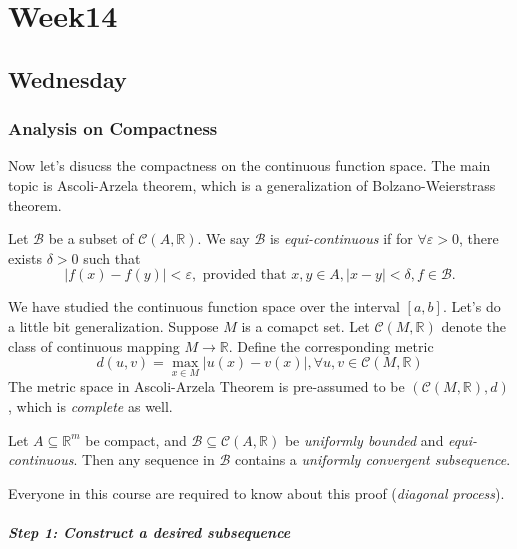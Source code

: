 
\chapter{Week14}
\section{Wednesday}
\subsection{Analysis on Compactness}
Now let's disucss the compactness on the continuous function space. The main topic is Ascoli-Arzela theorem, which is a generalization of Bolzano-Weierstrass theorem.
\begin{definition}
Let $\mathcal{B}$ be a subset of $\mathcal{C}(A,\mathbb{R})$. We say $\mathcal{B}$ is \emph{equi-continuous} if for $\forall\varepsilon>0$, there exists $\delta>0$ such that
\[
|f(x)-f(y)|<\varepsilon,
\mbox{ provided that }x,y\in A,|x-y|<\delta,f\in\mathcal{B}.
\]
\end{definition}
%
%
\begin{remark}
We have studied the continuous function space over the interval $[a,b]$. Let's do a little bit generalization. Suppose $M$ is a comapct set. Let $\mathcal{C}(M,\mathbb{R})$ denote the class of continuous mapping $M\to\mathbb{R}$. Define the corresponding metric
\[
d(u,v)=\max_{x\in M}|u(x)-v(x)|,\forall u,v\in\mathcal{C}(M,\mathbb{R})
\]
The metric space in Ascoli-Arzela Theorem is pre-assumed to be $(\mathcal{C}(M,\mathbb{R}),d)$, which is \emph{complete} as well.
\end{remark}

\begin{theorem}
Let $A\subseteq\mathbb{R}^m$ be compact, and $\mathcal{B}\subseteq\mathcal{C}(A,\mathbb{R})$ be \emph{uniformly bounded} and \emph{equi-continuous}. Then any sequence in $\mathcal{B}$ contains a \emph{uniformly convergent subsequence}.
\end{theorem}
\begin{remark}
Everyone in this course are required to know about this proof (\textit{diagonal process}).
\end{remark}

\paragraph{Step 1: Construct a desired subsequence}

